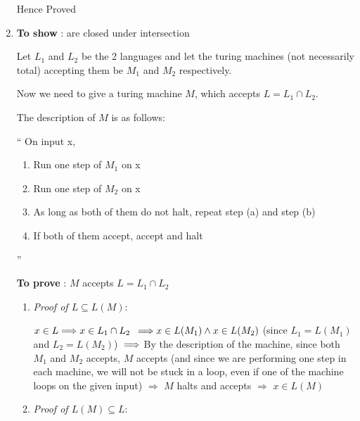 \begin{enumerate}
\begin{enumerate}
    \end{enumerate}
    
Hence Proved

\item \textbf{To show} : \re are closed under intersection
    
    Let $L_1$ and $L_2$ be the 2 \re languages and let the turing machines (not necessarily total) accepting them be $M_1$ and $M_2$ respectively.

    Now we need to give a turing machine $M$, which accepts $ L = L_1 \cap L_2 $.

    The description of $M$ is as follows:

    ``
        On input x,
        \begin{enumerate}
            \item \label{int_step_1} Run one step of $M_1$ on x
            \item \label{int_step_2} Run one step of $M_2$ on x
            \item \label{int_step_3} As long as both of them do not halt, repeat step (a)
            and step (b)\
            \item \label{int_step_4} If both of them accept, accept and halt
        \end{enumerate}
    ''

    \textbf{To prove} : $M$ accepts $L = L_1 \cap L_2$

    \begin{enumerate}
    \item \textit{Proof of $L \subseteq L(M)$}:
            
$ 
x \in L 
\newline
\Longrightarrow 
x \in L_1 \cap L_2
$
$
\newline
\Longrightarrow
x \in L(M_1) \land x \in L(M_2)$
(since $L_1 = L(M_1)$ and $L_2 = L(M_2)$)
$
\newline
\Longrightarrow
$
By the description of the machine, since both $M_1$ and $M_2$ accepts, $M$ accepts (and since we are performing one step in each machine, we will not be stuck in a loop, even if one of the machine loops on the given input)
\newline
$\Longrightarrow$
$M$ halts and accepts
\newline
$\Longrightarrow$
$ x \in L(M)$


\item \textit{Proof of $L(M) \subseteq L$}:


\end{enumerate}
\end{enumerate}
